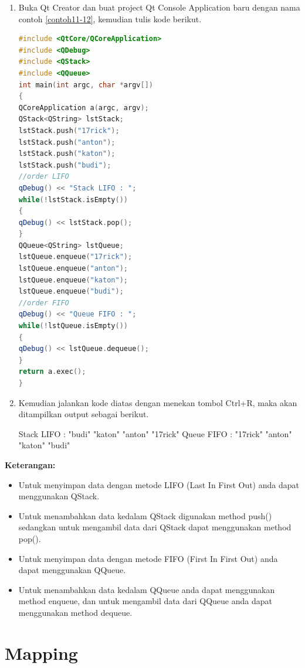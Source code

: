 \begin{enumerate}

\item
  Buka Qt Creator dan buat project Qt Console Application baru dengan
  nama contoh \ref{contoh11-12}, kemudian tulis kode berikut.

\begin{lstlisting}[language=c++, caption=Menggunakan Stack dan Queue, label=contoh11-12]
#include <QtCore/QCoreApplication>
#include <QDebug>
#include <QStack>
#include <QQueue>
int main(int argc, char *argv[])
{
QCoreApplication a(argc, argv);
QStack<QString> lstStack;
lstStack.push("17rick");
lstStack.push("anton");
lstStack.push("katon");
lstStack.push("budi");
//order LIFO
qDebug() << "Stack LIFO : ";
while(!lstStack.isEmpty())
{
qDebug() << lstStack.pop();
}
QQueue<QString> lstQueue;
lstQueue.enqueue("17rick");
lstQueue.enqueue("anton");
lstQueue.enqueue("katon");
lstQueue.enqueue("budi");
//order FIFO
qDebug() << "Queue FIFO : ";
while(!lstQueue.isEmpty())
{
qDebug() << lstQueue.dequeue();
}
return a.exec();
}
\end{lstlisting}
\item
  Kemudian jalankan kode diatas dengan menekan tombol Ctrl+R, maka akan
  ditampilkan output sebagai berikut.
\begin{lcverbatim}
Stack LIFO : 
"budi"
"katon"
"anton"
"17rick"
Queue FIFO : 
"17rick"
"anton"
"katon"
"budi"
\end{lcverbatim}
\end{enumerate}

\textbf{Keterangan:}

\begin{itemize}

\item
  Untuk menyimpan data dengan metode LIFO (Last In First Out) anda dapat
  menggunakan QStack.
\item
  Untuk menambahkan data kedalam QStack digunakan method push()
  sedangkan untuk mengambil data dari QStack dapat menggunakan method
  pop().
\item
  Untuk menyimpan data dengan metode FIFO (First In First Out) anda
  dapat menggunakan QQueue.
\item
  Untuk menambahkan data kedalam QQueue anda dapat menggunakan method
  enqueue, dan untuk mengambil data dari QQueue anda dapat menggunakan
  method dequeue.
\end{itemize}

\section{Mapping}\label{mapping}

